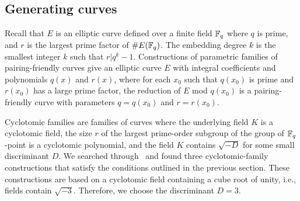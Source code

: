 

\subsection{Generating curves}
\label{subsec:gencurves}

Recall that $E$ is an elliptic curve defined over a finite field $\mathbb{F}_{q}$ where $q$ is prime,
and $r$ is the largest prime factor of $\# E(\mathbb{F}_{q})$.
The embedding degree $k$ is the smallest integer $k$ such that $r | q^k -1$.
Constructions of parametric families of pairing-friendly curves give an elliptic curve $E$ with integral coefficients and polynomials $q(x)$ and $r(x)$,
where for each $x_0$ such that $q(x_0)$ is prime and $r(x_0)$ has a large prime factor, the reduction of $E$ mod $q(x_0)$ is a pairing-friendly curve with parameters $q = q(x_0)$ and $r = r(x_0)$.

Cyclotomic families are families of curves where the underlying field $K$ is a cyclotomic field,
the size $r$ of the largest prime-order subgroup of the group of $\mathbb{F}_{q}$-point is a cyclotomic polynomial,
and the field $K$ contains $\sqrt{-D}$ for some small discriminant $D$.
We searched through~\cite{2010/freeman} and found three cyclotomic-family constructions that satisfy the conditions outlined in the previous section.
These constructions are based on a cyclotomic field containing a cube root of unity,
i.e., fields contain $\sqrt{-3}$.
Therefore, we choose the discriminant $D = 3$.

